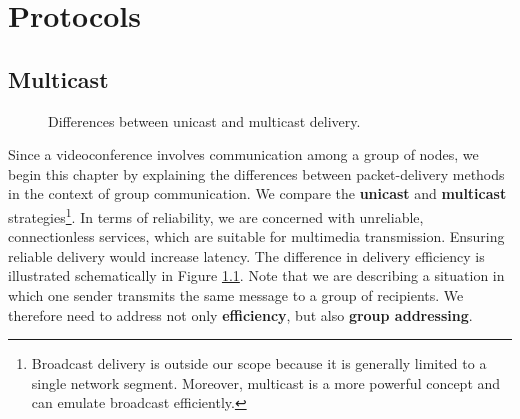 \chapter{Protocols}

\section{Multicast}\label{kap:Multicast}

\begin{figure}
\centering

\caption{Differences between unicast and multicast delivery.}
\label{fig:UnicastMulticast}
\end{figure}

Since a videoconference involves communication among a group of nodes, we begin this chapter by explaining the differences between packet-delivery methods in the context of group communication. We compare the \textbf{unicast} and \textbf{multicast} strategies\footnote{Broadcast delivery is outside our scope because it is generally limited to a single network segment. Moreover, multicast is a more powerful concept and can emulate broadcast efficiently.}. In terms of reliability, we are concerned with unreliable, connectionless services, which are suitable for multimedia transmission. Ensuring reliable delivery would increase latency. The difference in delivery efficiency is illustrated schematically in Figure \ref{fig:UnicastMulticast}. Note that we are describing a situation in which one sender transmits the same message to a group of recipients. We therefore need to address not only \textbf{efficiency}, but also \textbf{group addressing}.

